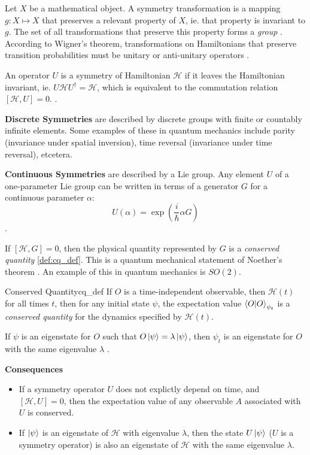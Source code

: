 \documentclass{article}
\newcommand{\hamiltonian}{\mathcal{H}}
\begin{document}
	Let $X$ be a mathematical object. A symmetry transformation is a mapping $g: X \mapsto X$ that preserves a relevant property of $X$, ie. that property is invariant to $g$. The set of all transformations that preserve this property forms a \textit{group} \cite{cantwell2016introduction}. According to Wigner's theorem, transformations on Hamiltonians that preserve transition probabilities must be unitary or anti-unitary operators \cite{corry2017symmetry}.
	
	An operator $U$ is a symmetry of Hamiltonian $\hamiltonian$ if it leaves the Hamiltonian invariant, ie. $U\hamiltonian U^\dagger =\hamiltonian$, which is equivalent to the commutation relation $[\hamiltonian, U] = 0$. \cite{corry2017symmetry}.
	
	\textbf{Discrete Symmetries} are described by discrete groups with finite or countably infinite elements. Some examples of these in quantum mechanics include parity (invariance under spatial inversion), time reversal (invariance under time reversal), etcetera.
	
	\textbf{Continuous Symmetries} are described by a Lie group. Any element $U$ of a one-parameter Lie group can be written in terms of a generator $G$ for a continuous parameter $\alpha$: $$U(\alpha) = \exp\left(\frac{i}{\hslash}\alpha G\right)$$.
	
	If $[\hamiltonian, G] = 0$, then the physical quantity represented by $G$ is a \textit{conserved quantity} \ref{def:cq_def}. This is a quantum mechanical statement of Noether's theorem \cite{ouderaaNoethersRazorLearning2024}. An example of this in quantum mechanics is $SO(2)$.\\
	
	\begin{definition}{Conserved Quantity}{cq_def}
		If $O$ is a time-independent observable, then $\hamiltonian(t)$ for all times $t$, then for any initial state $\psi$, the expectation value $\braket{O}_{\psi_t}$ is a \textit{conserved quantity} for the dynamics specified by $\hamiltonian(t)$.
		
		If $\psi$ is an eigenstate for $O$ such that $O\ket{\psi} = \lambda \ket{\psi}$, then $\psi_t$ is an eigenstate for $O$ with the same eigenvalue $\lambda$ \cite{corry2017symmetry}.
	\end{definition}
	
	\textbf{Consequences}
	\begin{itemize}
		\item If a symmetry operator $U$ does not explictly depend on time, and $[\hamiltonian, U] = 0$, then the expectation value of any observable $A$ associated with $U$ is conserved.
		\item If $\ket{\psi}$ is an eigenstate of $\hamiltonian$ with eigenvalue $\lambda$, then the state $U\ket{\psi}$ ($U$ is a symmetry operator) is also an eigenstate of $\hamiltonian$ with the same eigenvalue $\lambda$.
	\end{itemize}
	
\end{document}
